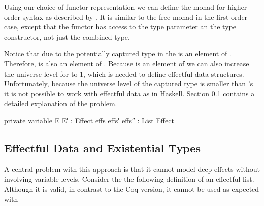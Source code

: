 Using our choice of functor representation we can define the 
monad for higher order syntax as described by
\textcite{DBLP:conf/haskell/WuSH14}.
It is similar to the free monad in the first order case, except that the functor
has access to the type parameter an the type constructor, not just the
combined type.

Notice that due to the potentially captured type in the  is an
element of .
Therefore,  is also an element of .
Because  is an element of  we can also
increase the universe level for  to $1$, which is needed to
define effectful data structures.
Unfortunately, because the universe level of the captured type is smaller than
's it is not possible to work with effectful data as in
Haskell.
Section \ref{higher-order:eff-data-ext-types} contains a detailed explanation of
the problem.

\begin{code}[hide]
private
  variable
    E E′ : Effect
    effs effs′ effs″ : List Effect
\end{code}

\subsection{Effectful Data and Existential Types}
\label{higher-order:eff-data-ext-types}

A central problem with this approach is that it cannot model deep effects
without involving variable levels.
Consider the the following definition of an effectful list.
Although it is valid, in contrast to the Coq version, it cannot be used as
expected with 

